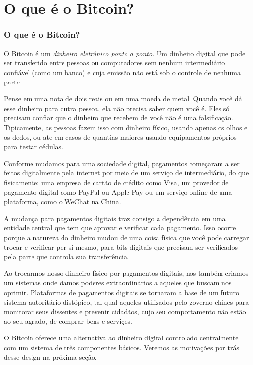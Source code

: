 \part{O que é o Bitcoin?}
\label{ch:capitulo1}
\section*{O que é o Bitcoin?}

O Bitcoin é um \textit{dinheiro eletrônico ponto a ponto}. Um dinheiro digital que pode ser transferido entre pessoas ou computadores sem nenhum intermediário confiável (como um banco) e cuja emissão não está sob o controle de nenhuma parte.

Pense em uma nota de dois reais ou em uma moeda de metal. Quando você dá esse dinheiro para outra pessoa, ela não precisa saber quem você é. Eles só precisam confiar que o dinheiro que recebem de você não é uma falsificação. Tipicamente, as pessoas fazem isso com dinheiro físico, usando apenas os olhos e os dedos, ou ate em casos de quantias maiores usando equipamentos próprios para testar cédulas.

Conforme mudamos para uma sociedade digital, pagamentos começaram a ser feitos digitalmente pela internet por meio de um serviço de intermediário, do que fisicamente: uma empresa de cartão de crédito como Visa, um provedor de pagamento digital como PayPal ou Apple Pay ou um serviço online de uma plataforma, como o WeChat na China.

A mudança para pagamentos digitais traz consigo a dependência em uma entidade central que tem que aprovar e verificar cada pagamento. Isso ocorre porque a natureza do dinheiro mudou de uma coisa física que você pode carregar trocar e verificar por si mesmo, para bits digitais que precisam ser verificados pela parte que controla sua transferência.


Ao trocarmos nosso dinheiro físico por pagamentos digitais, nos também criamos um sistemas onde damos poderes extraordinários a aqueles que buscam nos oprimir.
Plataformas de pagamentos digitais se tornaram a base de um futuro sistema autoritário distópico, tal qual aqueles utilizados pelo governo chines para monitorar seus dissentes e prevenir cidadãos, cujo seu comportamento não estão ao seu agrado, de comprar bens e serviços.

O Bitcoin oferece uma alternativa ao dinheiro digital controlado centralmente com um sistema de três componentes básicos. Veremos as motivações por trás desse design na próxima seção.

